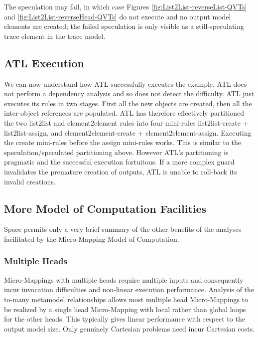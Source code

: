 \documentclass[conference]{IEEEtran}
\begin{document}
The speculation may fail, in which case Figures \ref{fig:List2List-reverseList-QVTs} and \ref{fig:List2List-reverseHead-QVTs} do not execute and no output model elements are created; the failed speculation is only visible as a still-speculating trace element in the trace model.

\subsection{ATL Execution}\label{ATL Execution}

We can now understand how ATL successfully executes the example. ATL does not perform a dependency analysis and so does not detect the difficulty. ATL just executes its rules in two stages. First all the new objects are created, then all the inter-object references are populated. ATL has therefore effectively partitioned the two list2list and element2element rules into four mini-rules list2list-create + list2list-assign, and element2element-create + element2element-assign. Executing the create mini-rules before the assign mini-rules works. This is similar to the speculation/speculated partitioning above. However ATL's partitioning is pragmatic and the successful execution fortuitous. If a more complex guard invalidates the premature creation of outputs, ATL is unable to roll-back its invalid creations.

\subsection{More Model of Computation Facilities}

Space permits only a very brief summary of the other benefits of the analyses facilitated by the Micro-Mapping Model of Computation.

\subsubsection{Multiple Heads}\label{Multiple Heads}

Micro-Mappings with multiple heads require multiple inputs and consequently incur invocation difficulties and non-linear execution performance. Analysis of the to-many metamodel relationships allows most multiple head Micro-Mappings to be realized by a single head Micro-Mapping with local rather than global loops for the other heads. This typically gives linear performance with respect to the output model size. Only genuinely Cartesian problems need incur Cartesian costs.
\end{document}

